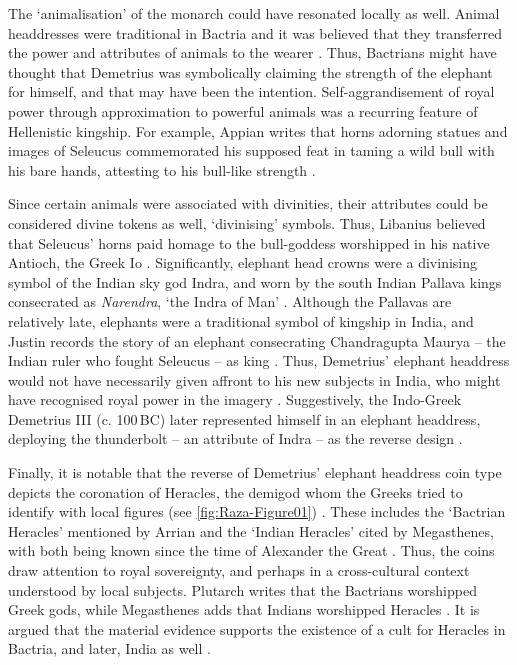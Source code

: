 \documentclass{ijsra}
\renewcommand\BC{{\,BC\xspace}}
\begin{document}
The ‘animalisation’ of the monarch could have resonated locally as well. Animal headdresses were traditional in Bactria and it was believed that they transferred the power and attributes of animals to the wearer \parencite[215--226]{Lerner2009}.
Thus, Bactrians might have thought that Demetrius was symbolically claiming the strength of the elephant for himself, and that may have been the intention.
Self-aggrandisement of royal power through approximation to powerful animals was a recurring feature of Hellenistic kingship.
For example, Appian writes that horns adorning statues and images of Seleucus commemorated his supposed feat in taming a wild bull with his bare hands,
attesting to his bull-like strength \parencites[53]{Alonso2014}[]{App. Syr. 57}[120]{Erickson2013}.

Since certain animals were associated with divinities, their attributes could be considered divine tokens as well, ‘divinising’ symbols.
Thus, Libanius believed that Seleucus’ horns paid homage to the bull-goddess worshipped in his native Antioch, the Greek Io \parencites[121]{Erickson2013}[]{Lib. Or. 11.92}.
Significantly, elephant head crowns were a divinising symbol of the Indian sky god Indra, and worn by the south Indian Pallava kings consecrated as \emph{Narendra}, ‘the Indra of Man’ \parencite[66--70]{Hudson2008}.
Although the Pallavas are relatively late, elephants were a traditional symbol of kingship in India, and Justin records the story of an elephant consecrating Chandragupta Maurya – the Indian ruler who fought Seleucus – as king \parencite[]{Justin. Ep. 15.4}.
Thus, Demetrius’ elephant headdress would not have necessarily given affront to his new subjects in India, who might have recognised royal power in the imagery \parencite[465]{Narain2003}.
Suggestively, the Indo-Greek Demetrius III (c. 100\BC) later represented himself in an elephant headdress, deploying the thunderbolt – an attribute of Indra – as the reverse design \parencite[17--18]{Kalita1997}.  

Finally, it is notable that the reverse of Demetrius’ elephant headdress coin type depicts the coronation of Heracles, the demigod whom the Greeks tried to identify with local figures (see \cref{fig:Raza-Figure01}) \parencites[70--80]{Bukharin2004}[140]{Stanco2012}.
These includes the ‘Bactrian Heracles’ mentioned by Arrian and the ‘Indian Heracles’ cited by Megasthenes, with both being known since the time of Alexander the Great \parencites[]{Arr. Anab. 4.28}[]{Arr. Ind. 8.4}.
Thus, the coins draw attention to royal sovereignty, and perhaps in a cross-cultural context understood by local subjects.
Plutarch writes that the Bactrians worshipped Greek gods,
while Megasthenes adds that Indians worshipped Heracles \parencites[]{Arr. Ind. 8.4}[]{Plut. Mor. 328d}[420]{Potter2003}.
It is argued that the material evidence supports the existence of a cult for Heracles in Bactria, and later, India as well \parencite[248]{Stanco2012}. 
\end{document}

